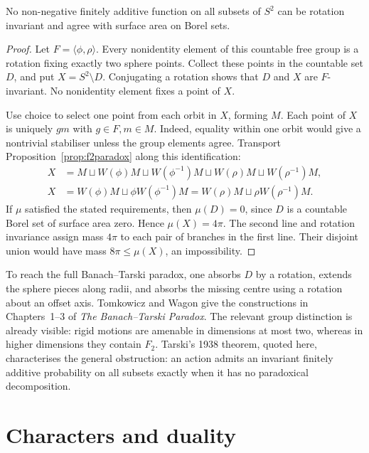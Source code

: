 \begin{theorem}[Hausdorff, 1914]\label{thm:hausdorff}
No non-negative finitely additive function on all subsets of $S^2$ can be rotation invariant and agree with surface area on Borel sets.
\end{theorem}
\begin{proof}
Let $F=\langle\phi,\rho\rangle$. Every nonidentity element of this countable free group is a rotation fixing exactly two sphere points. Collect these points in the countable set $D$, and put $X=S^2\setminus D$. Conjugating a rotation shows that $D$ and $X$ are $F$-invariant. No nonidentity element fixes a point of $X$.

Use choice to select one point from each orbit in $X$, forming $M$. Each point of $X$ is uniquely $gm$ with $g\in F,m\in M$. Indeed, equality within one orbit would give a nontrivial stabiliser unless the group elements agree. Transport Proposition~\ref{prop:f2paradox} along this identification:
\[\begin{aligned}
X&=M\sqcup W(\phi)M\sqcup W(\phi^{-1})M\sqcup W(\rho)M\sqcup W(\rho^{-1})M,\\
X&=W(\phi)M\sqcup\phi W(\phi^{-1})M
 =W(\rho)M\sqcup\rho W(\rho^{-1})M.
\end{aligned}\]
If $\mu$ satisfied the stated requirements, then $\mu(D)=0$, since $D$ is a countable Borel set of surface area zero. Hence $\mu(X)=4\pi$. The second line and rotation invariance assign mass $4\pi$ to each pair of branches in the first line. Their disjoint union would have mass $8\pi\le\mu(X)$, an impossibility.
\end{proof}

\begin{remark}
To reach the full Banach--Tarski paradox, one absorbs $D$ by a rotation, extends the sphere pieces along radii, and absorbs the missing centre using a rotation about an offset axis. Tomkowicz and Wagon give the constructions in Chapters~1--3 of \emph{The Banach--Tarski Paradox}. The relevant group distinction is already visible: rigid motions are amenable in dimensions at most two, whereas in higher dimensions they contain $F_2$. Tarski's 1938 theorem, quoted here, characterises the general obstruction: an action admits an invariant finitely additive probability on all subsets exactly when it has no paradoxical decomposition.
\end{remark}

\section{Characters and duality}

